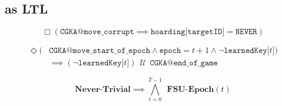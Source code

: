 \hypertarget{fsu-as-ltl}{%
\subsection{ as LTL}\label{fsu-as-ltl}}

\begin{LTL}
    $$
    \Box \left( \texttt{CGKA@move\_corrupt} \implies \texttt{hoarding[targetID]} = \texttt{NEVER} \right)
    $$
\end{LTL}

\begin{LTL}
    \begin{equation*}
    \begin{split}
    \Diamond ( & \texttt{CGKA@move\_start\_of\_epoch} \land \texttt{epoch} = t + 1 \land \neg \texttt{learnedKey[$t$]} ) \\
    & \implies ( \neg \texttt{learnedKey[$t$]} ) \,\;{\mathcal {U}}\;\, \texttt{CGKA@end\_of\_game}
    \end{split}
    \end{equation*}
\end{LTL}

\begin{LTL}
    $$
    \textbf{Never-Trivial} \implies \bigwedge\limits_{t=0}^{T-1} \;\,\textbf{FSU-Epoch}(t)
    $$
\end{LTL}
